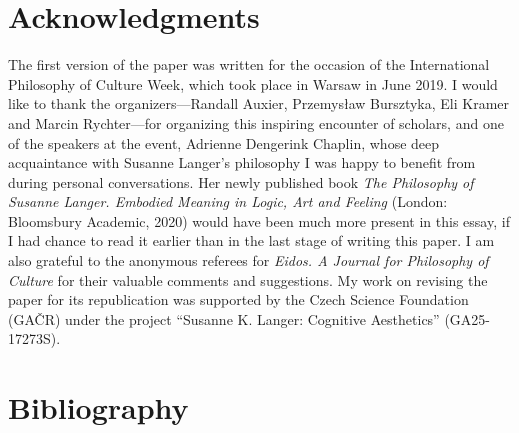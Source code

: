 \documentclass{tufte-handout}
\begin{document}
\hypertarget{acknowledgments}{%
\section{Acknowledgments}\label{acknowledgments}}

The first version of the paper was written for the occasion of the
International Philosophy of Culture Week, which took place in Warsaw in
June 2019. I would like to thank the organizers---Randall Auxier,
Przemysław Bursztyka, Eli Kramer and Marcin Rychter---for organizing
this inspiring encounter of scholars, and one of the speakers at the
event, Adrienne Dengerink Chaplin, whose deep acquaintance with Susanne
Langer's philosophy I was happy to benefit from during personal
conversations. Her newly published book \emph{The Philosophy of Susanne
Langer. Embodied Meaning in Logic, Art and Feeling} (London: Bloomsbury
Academic, 2020) would have been much more present in this essay, if I
had chance to read it earlier than in the last stage of writing this
paper. I am also grateful to the anonymous referees for \emph{Eidos. A
Journal for Philosophy of Culture} for their valuable comments and
suggestions. My work on revising the paper for its republication was
supported by the Czech Science Foundation (GAČR) under the project
``Susanne K. Langer: Cognitive Aesthetics'' (GA25-17273S).


\section{Bibliography}\label{bibliography}
\end{document}
